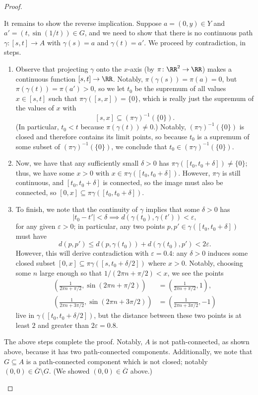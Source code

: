 \documentclass[../notes.tex]{subfiles}
\begin{document}
\begin{proof}
\begin{itemize}
		It remains to show the reverse implication. Suppose $a=(0,y)\in Y$ and $a'=(t,\sin(1/t))\in G$, and we need to show that there is no continuous path $\gamma\colon[s,t]\to A$ with $\gamma(s)=a$ and $\gamma(t)=a'$. We proceed by contradiction, in steps.
		\begin{enumerate}
			\item Observe that projecting $\gamma$ onto the $x$-axis (by $\pi\colon\RR^2\to\RR$) makes a continuous function $[s,t]\to\RR$. Notably, $\pi(\gamma(s))=\pi(a)=0$, but $\pi(\gamma(t))=\pi(a')>0$, so we let $t_0$ be the supremum of all values $x\in[s,t]$ such that $\pi\gamma([s,x])=\{0\}$, which is really just the supremum of the values of $x$ with
			\[[s,x]\subseteq(\pi\gamma)^{-1}(\{0\}).\]
			(In particular, $t_0<t$ because $\pi(\gamma(t))\ne0$.) Notably, $(\pi\gamma)^{-1}(\{0\})$ is closed and therefore contains its limit points, so because $t_0$ is a supremum of some subset of $(\pi\gamma)^{-1}(\{0\})$, we conclude that $t_0\in(\pi\gamma)^{-1}(\{0\})$.
			\item Now, we have that any sufficiently small $\delta>0$ has $\pi\gamma([t_0,t_0+\delta])\ne\{0\}$; thus, {we have some $x>0$ with $x\in\pi\gamma([t_0,t_0+\delta])$}. However, $\pi\gamma$ is still continuous, and $[t_0,t_0+\delta]$ is connected, so the image must also be connected, so $[0,x]\subseteq\pi\gamma([t_0,t_0+\delta])$.
			\item To finish, we note that the continuity of $\gamma$ implies that some $\delta>0$ has
			\[|t_0-t'|<\delta\implies d(\gamma(t_0),\gamma(t'))<\varepsilon,\]
			for any given $\varepsilon>0$; in particular, any two points $p,p'\in\gamma([t_0,t_0+\delta])$ must have
			\[d(p,p')\le d(p,\gamma(t_0))+d(\gamma(t_0),p')<2\varepsilon.\]
			However, this will derive contradiction with $\varepsilon=0.4$: any $\delta>0$ induces some closed subset $[0,x]\subseteq\pi\gamma([s,t_0+\delta/2])$ where $x>0$. Notably, choosing some $n$ large enough so that $1/(2\pi n+\pi/2)<x$, we see the points
			\begin{align*}
				\left(\frac1{2\pi n+\pi/2},\sin(2\pi n+\pi/2)\right) &= \left(\frac1{2\pi n+\pi/2},1\right), \\
				\left(\frac1{2\pi n+3\pi/2},\sin(2\pi n+3\pi/2)\right) &= \left(\frac1{2\pi n+3\pi/2},-1\right)
			\end{align*}
			live in $\gamma([t_0,t_0+\delta/2])$, but the distance between these two points is at least $2$ and greater than $2\varepsilon=0.8$.
		\end{enumerate}
		The above steps complete the proof. Notably, $A$ is not path-connected, as shown above, because it has two path-connected components. Additionally, we note that $G\subseteq A$ is a path-connected component which is not closed; notably $(0,0)\in\overline G\setminus G$. (We showed $(0,0)\in\overline G$ above.)
		\qedhere
	\end{itemize}
\end{proof}
\end{document}
